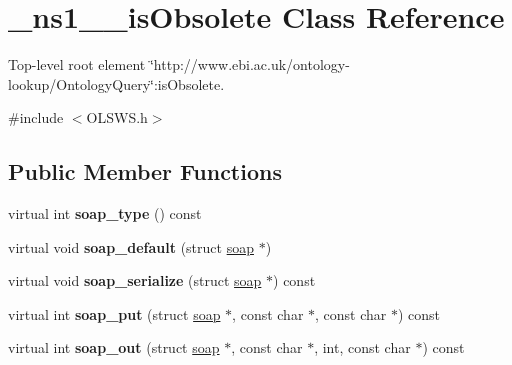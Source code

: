 \hypertarget{class__ns1____isObsolete}{
\section{\_\-ns1\_\-\_\-isObsolete Class Reference}
\label{class__ns1____isObsolete}
}


Top-\/level root element \char`\"{}http://www.ebi.ac.uk/ontology-\/lookup/OntologyQuery\char`\"{}:isObsolete.  




{\ttfamily \#include $<$OLSWS.h$>$}

\subsection*{Public Member Functions}
\begin{DoxyCompactItemize}
\item 
\hypertarget{class__ns1____isObsolete_a27b1179790a5da1c147424c522181960}{
virtual int {\bfseries soap\_\-type} () const }
\label{class__ns1____isObsolete_a27b1179790a5da1c147424c522181960}

\item 
\hypertarget{class__ns1____isObsolete_a2e935316dc04d5a63ec8286feac1656e}{
virtual void {\bfseries soap\_\-default} (struct \hyperlink{class__ns1____isObsolete_a32fbc137d310a506421592c6eb9cd6f1}{soap} $\ast$)}
\label{class__ns1____isObsolete_a2e935316dc04d5a63ec8286feac1656e}

\item 
\hypertarget{class__ns1____isObsolete_a597ace45f8df539c6cc8eb1b50f74e36}{
virtual void {\bfseries soap\_\-serialize} (struct \hyperlink{class__ns1____isObsolete_a32fbc137d310a506421592c6eb9cd6f1}{soap} $\ast$) const }
\label{class__ns1____isObsolete_a597ace45f8df539c6cc8eb1b50f74e36}

\item 
\hypertarget{class__ns1____isObsolete_a22f621d330809f2782c6bceccb773fe0}{
virtual int {\bfseries soap\_\-put} (struct \hyperlink{class__ns1____isObsolete_a32fbc137d310a506421592c6eb9cd6f1}{soap} $\ast$, const char $\ast$, const char $\ast$) const }
\label{class__ns1____isObsolete_a22f621d330809f2782c6bceccb773fe0}

\item 
\hypertarget{class__ns1____isObsolete_aca6dab53dffc0d58d8c83c92de890926}{
virtual int {\bfseries soap\_\-out} (struct \hyperlink{class__ns1____isObsolete_a32fbc137d310a506421592c6eb9cd6f1}{soap} $\ast$, const char $\ast$, int, const char $\ast$) const }
\label{class__ns1____isObsolete_aca6dab53dffc0d58d8c83c92de890926}


\end{DoxyCompactItemize}
